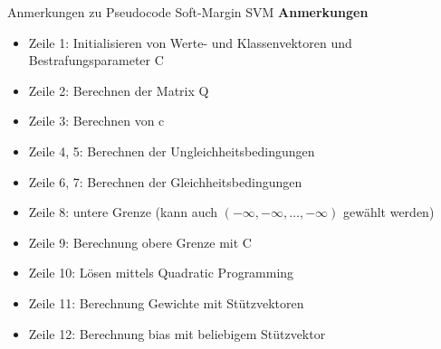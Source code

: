 \documentclass[ngerman]{beamer}
\begin{document}
\begin{frame}{Anmerkungen zu Pseudocode Soft-Margin SVM}
    \textbf{Anmerkungen} \\
    \begin{itemize}
        \item Zeile 1: Initialisieren von Werte- und Klassenvektoren und Bestrafungsparameter C
        \item Zeile 2: Berechnen der Matrix Q
        \item Zeile 3: Berechnen von c
        \item Zeile 4, 5: Berechnen der Ungleichheitsbedingungen
        \item Zeile 6, 7: Berechnen der Gleichheitsbedingungen
        \item Zeile 8: untere Grenze (kann auch $\left( -\infty, -\infty, \ldots, -\infty \right)$ gewählt werden)
        \item Zeile 9: Berechnung obere Grenze mit C
        \item Zeile 10: Lösen mittels Quadratic Programming
        \item Zeile 11: Berechnung Gewichte mit Stützvektoren
        \item Zeile 12: Berechnung bias mit beliebigem Stützvektor
    \end{itemize}
\end{frame}
\end{document}
